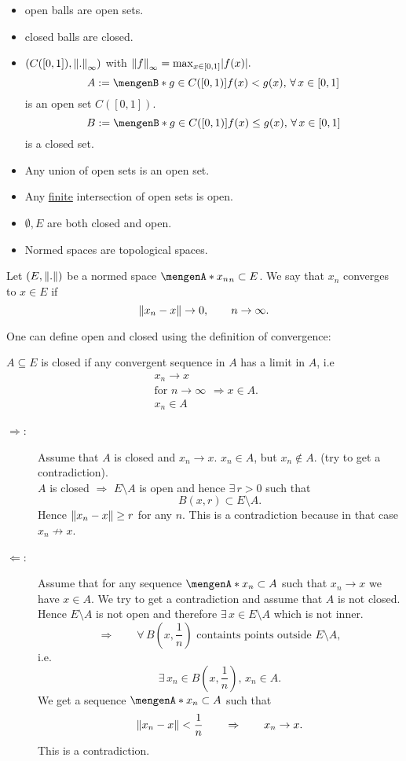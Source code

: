 \begin{bemerkung}
	\begin{itemize}
		\item open balls are open sets.
		\item closed balls are closed.
		\item $(C([0,1]),\norm{.}_{\infty})$ with $\norm{f}_{\infty}= \max_{x \in [0,1]}\abs{f(x)}.$ 
		\[
			A := \set[g \in C([0,1])]{f(x) < g(x),\,\forall\, x \in [0,1]}
		\]
		is an open set $C([0,1])$.
		\[
			B := \set[g \in C([0,1])]{f(x) \leq g(x),\,\forall\, x \in [0,1]}
 		\]
		is a closed set.
	\end{itemize}
	\begin{itemize}
		\item Any union of open sets is an open set.
		\item Any \underline{finite} intersection of open sets is open.
		\item $\emptyset,E$ are both closed and open.
		\item Normed spaces are topological spaces.
	\end{itemize}
\end{bemerkung}
\begin{definition*}
	Let $(E,\norm{.})$ be a normed space $\set{x_n}_n \subset E$. We say that $x_n$ converges to $x \in E$ if 
	\[
		\norm{x_n-x} \to 0, \qquad n \to \infty.
	\]
\end{definition*}
One can define open and closed using the definition of convergence:
\begin{satz} %
	$A \subseteq E$ is closed if any convergent sequence in $A$ has a limit in $A$, i.e
	\[
		\substack{x_n \to x \\ \text{for }n \to \infty \\ x_n \in A} \Rightarrow x \in A.
	\]
\end{satz}
\begin{beweis}
	\begin{description}
		\item[$\Rightarrow$:]Assume that $A$ is closed and $x_n \to x$. $x_n \in A$, but $x_n \not \in A$. (try to get a contradiction). \\
	 $A$ is closed $\Rightarrow $ $E \setminus A$ is open and hence $\exists\, r >0$ such that
	 \[
	 	B(x,r) \subset E \setminus A.
	 \]
	 Hence $\norm{x_n -x} \geq r$ for any $n$. This is a contradiction because in that case $x_n \not \to x$.
	 \item[$\Leftarrow $:] Assume that for any sequence $\set{x_n} \subset A$ such that $x_n \to x$ we have $x \in A$. We try to get a contradiction and assume that $A$ is not closed. Hence $E \setminus A$ is not open and therefore $\exists\, x \in E \setminus A$ which is not inner.
	 \[
	 	\Rightarrow \qquad  \forall\, B(x,\frac{1}{n}) \text{ containts points outside }E \setminus A, 
	 \]
	 i.e.
	 \[
	 	\exists\, x_n \in B(x, \frac{1}{n}), \, x_n \in A.
	 \]
	 We get a sequence $\set{x_n} \subset A$ such that
	 \[
	 	\norm{x_n-x} < \frac{1}{n} \qquad \Rightarrow \qquad x_n \to x.
	 \]
	 This is a contradiction.
	\end{description}
\end{beweis}
